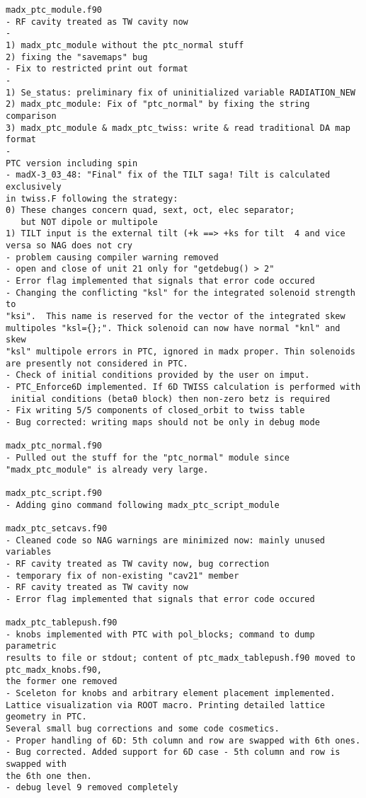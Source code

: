 \begin{verbatim}
madx_ptc_module.f90
- RF cavity treated as TW cavity now
-
1) madx_ptc_module without the ptc_normal stuff
2) fixing the "savemaps" bug
- Fix to restricted print out format
-
1) Se_status: preliminary fix of uninitialized variable RADIATION_NEW
2) madx_ptc_module: Fix of "ptc_normal" by fixing the string comparison
3) madx_ptc_module & madx_ptc_twiss: write & read traditional DA map format
-
PTC version including spin
- madX-3_03_48: "Final" fix of the TILT saga! Tilt is calculated exclusively
in twiss.F following the strategy:
0) These changes concern quad, sext, oct, elec separator;
   but NOT dipole or multipole
1) TILT input is the external tilt (+k ==> +ks for tilt  4 and vice versa so NAG does not cry
- problem causing compiler warning removed
- open and close of unit 21 only for "getdebug() > 2"
- Error flag implemented that signals that error code occured
- Changing the conflicting "ksl" for the integrated solenoid strength to
"ksi".  This name is reserved for the vector of the integrated skew
multipoles "ksl={};". Thick solenoid can now have normal "knl" and skew
"ksl" multipole errors in PTC, ignored in madx proper. Thin solenoids
are presently not considered in PTC.
- Check of initial conditions provided by the user on imput.
- PTC_Enforce6D implemented. If 6D TWISS calculation is performed with
 initial conditions (beta0 block) then non-zero betz is required
- Fix writing 5/5 components of closed_orbit to twiss table
- Bug corrected: writing maps should not be only in debug mode

madx_ptc_normal.f90
- Pulled out the stuff for the "ptc_normal" module since
"madx_ptc_module" is already very large.

madx_ptc_script.f90
- Adding gino command following madx_ptc_script_module

madx_ptc_setcavs.f90
- Cleaned code so NAG warnings are minimized now: mainly unused variables
- RF cavity treated as TW cavity now, bug correction
- temporary fix of non-existing "cav21" member
- RF cavity treated as TW cavity now
- Error flag implemented that signals that error code occured

madx_ptc_tablepush.f90
- knobs implemented with PTC with pol_blocks; command to dump parametric 
results to file or stdout; content of ptc_madx_tablepush.f90 moved to 
ptc_madx_knobs.f90, 
the former one removed
- Sceleton for knobs and arbitrary element placement implemented. 
Lattice visualization via ROOT macro. Printing detailed lattice geometry in PTC. 
Several small bug corrections and some code cosmetics.
- Proper handling of 6D: 5th column and row are swapped with 6th ones.
- Bug corrected. Added support for 6D case - 5th column and row is swapped with 
the 6th one then.
- debug level 9 removed completely


\end{verbatim}
